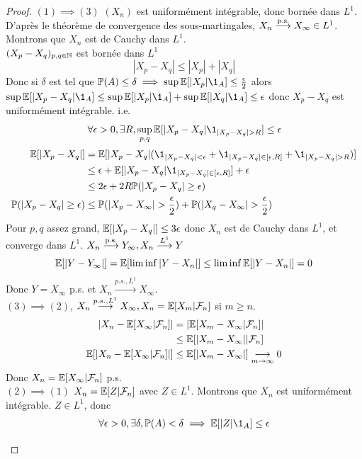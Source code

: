 \documentclass[]{report}
\begin{document}
    \begin{proof}
        $(1)\implies (3)$ $(X_n)$ est uniformément intégrable, donc bornée dans $L^1$. D'après le théorème de convergence des sous-martingales, $X_n\overset{\text{p.s.}}{\longrightarrow} X_\infty \in L^1$. Montrons que $X_n$ est de Cauchy dans $L^1$.\\
        $(X_p-X_q)_{p,q\in \mathbb{N}}$ est bornée dans $L^1$
        \[|X_p-X_q|\le |X_p|+|X_q|\]
        Donc si $\delta$ est tel que $\Pa(A)\le \delta\implies \sup\Ea[|X_p|\1_A]\le \frac{\epsilon}{2}$ alors $\sup\Ea[|X_p-X_q|\1_A]\le \sup\Ea[|X_p|\1_A]+\sup\Ea[|X_q|\1_A]\le \epsilon$ donc $X_p-X_q$ est uniformément intégrable. i.e.
        \[\forall \epsilon>0,\exists R,\sup_{p,q}\Ea[|X_p-X_q|\1_{|X_p-X_q|>R}]\le \epsilon\]
        \begin{align*}
            \Ea[|X_p-X_q|]&=\Ea[|X_p-X_q|(\1_{|X_p-X_q|<\epsilon}+\1_{|X_p-X_q|\in [\epsilon,R]}+\1_{|X_p-X_q|>R})]\\
            &\le \epsilon +\Ea[|X_p-X_q|\1_{|X_p-X_q|\in [\epsilon,R]}]+\epsilon\\
            &\le 2\epsilon +2 R\Pa(|X_p-X_q|\ge \epsilon)\\
            \Pa(|X_p-X_q|\ge \epsilon)&\le\Pa(|X_p-X_\infty|>\frac{\epsilon}{2})+\Pa(|X_q-X_\infty|>\frac{\epsilon}{2}) 
        \end{align*}
        Pour $p,q$ assez grand, $\mathbb{E}[|X_p-X_q|]\le 3\epsilon$ donc $X_n$ est de Cauchy dans $L^1$, et converge dans $L^1$. $X_n\overset{\text{p.s.}}{\longrightarrow} Y_{\infty},X_n\overset{L^1}{\longrightarrow} Y$
        \[\mathbb{E}[|Y-Y_\infty|]=\mathbb{E}[\liminf |Y-X_n|]\le \liminf \mathbb{E}[|Y-X_n|]=0\]
        Donc $Y=X_\infty$ p.s. et $X_n\overset{p.s.,L^1}{\longrightarrow}X_\infty$.\\
        $(3)\implies(2)$, $X_n \overset{p.s.,L^1}{\longrightarrow}X_\infty, X_n=\mathbb{E}[X_m|\mathcal{F}_n]$ si $m\ge n$.
        \begin{align*}
            |X_n-\mathbb{E}[X_\infty|\mathcal{F}_n]|&=|\mathbb{E}[X_m-X_\infty|\mathcal{F}_n]|\\
            &\le \mathbb{E}[|X_m-X_\infty||\mathcal{F}_n]\\
            \mathbb{E}[|X_n-\mathbb{E}[X_\infty|\mathcal{F}_n]|]&\le \mathbb{E}[|X_m-X_\infty|]\underset{m\to \infty}{\longrightarrow}0
        \end{align*}
        Donc $X_n=\mathbb{E}[X_\infty|\mathcal{F}_n]$ p.s.\\
        $(2)\implies (1)$ $X_n=\mathbb{E}[Z|\mathcal{F}_n]$ avec $Z\in L^1$. Montrons que $X_n$ est uniformément intégrable. $Z\in L^1$, donc
        \[\forall \epsilon>0,\exists\delta,\Pa(A)<\delta\implies \Ea[|Z|\1_A]\le \epsilon\]
        \begin{align*}

\end{align*}
\end{proof}
\end{document}
